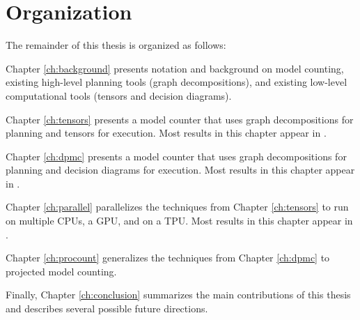 \section{Organization}
The remainder of this thesis is organized as follows:

Chapter \ref{ch:background} presents notation and background on model counting, existing high-level planning tools (graph decompositions), and existing low-level computational tools (tensors and decision diagrams). 

Chapter \ref{ch:tensors} presents a model counter  that uses graph decompositions for planning and tensors for execution. Most results in this chapter appear in \cite{DDV19}.

Chapter \ref{ch:dpmc} presents a model counter  that uses graph decompositions for planning and decision diagrams for execution. Most results in this chapter appear in \cite{dudek2020dpmc}.

Chapter \ref{ch:parallel} parallelizes the techniques from Chapter \ref{ch:tensors} to run on multiple CPUs, a GPU, and on a TPU. Most results in this chapter appear in \cite{dudek2020parallel}.

Chapter \ref{ch:procount} generalizes the techniques from Chapter \ref{ch:dpmc} to projected model counting.

Finally, Chapter \ref{ch:conclusion} summarizes the main contributions of this thesis and describes several possible future directions.